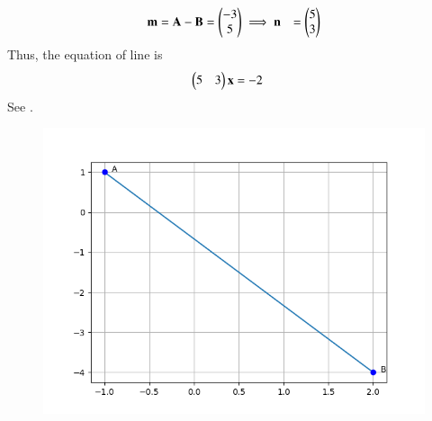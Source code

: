 \begin{align}
	\mathbf{m} &= \mathbf{A} - \mathbf{B}
= \begin{pmatrix}-3\\5\end{pmatrix}
\implies
\mathbf{n} &= \begin{pmatrix}5\\3\end{pmatrix}
\end{align}
Thus, the equation of line is
\begin{align}
 \begin{pmatrix} 5 & 3\end{pmatrix}\mathbf{x}  &= -2
\end{align}
See 
   .
\begin{figure}[h!]
  \centering
   \includegraphics[width=\linewidth]{chapters/11/10/2/7/figs/Figure_1.png}
   \caption{}
   \label{fig:chapters/11/10/2/7/Line_AB}
\end{figure}




